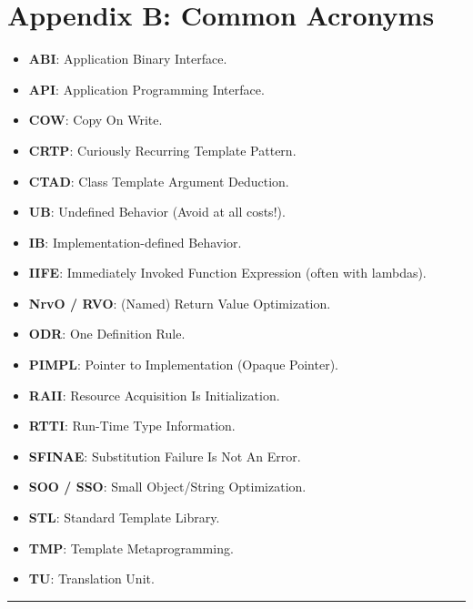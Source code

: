 \hypertarget{appendix-b-common-acronyms}{%
\section{Appendix B: Common Acronyms}\label{appendix-b-common-acronyms}}

\begin{itemize}
\tightlist
\item
  \textbf{ABI}: Application Binary Interface.
\item
  \textbf{API}: Application Programming Interface.
\item
  \textbf{COW}: Copy On Write.
\item
  \textbf{CRTP}: Curiously Recurring Template Pattern.
\item
  \textbf{CTAD}: Class Template Argument Deduction.
\item
  \textbf{UB}: Undefined Behavior (Avoid at all costs!).
\item
  \textbf{IB}: Implementation-defined Behavior.
\item
  \textbf{IIFE}: Immediately Invoked Function Expression (often with
  lambdas).
\item
  \textbf{NrvO / RVO}: (Named) Return Value Optimization.
\item
  \textbf{ODR}: One Definition Rule.
\item
  \textbf{PIMPL}: Pointer to Implementation (Opaque Pointer).
\item
  \textbf{RAII}: Resource Acquisition Is Initialization.
\item
  \textbf{RTTI}: Run-Time Type Information.
\item
  \textbf{SFINAE}: Substitution Failure Is Not An Error.
\item
  \textbf{SOO / SSO}: Small Object/String Optimization.
\item
  \textbf{STL}: Standard Template Library.
\item
  \textbf{TMP}: Template Metaprogramming.
\item
  \textbf{TU}: Translation Unit.
\end{itemize}

\begin{center}\rule{0.5\linewidth}{0.5pt}\end{center}
